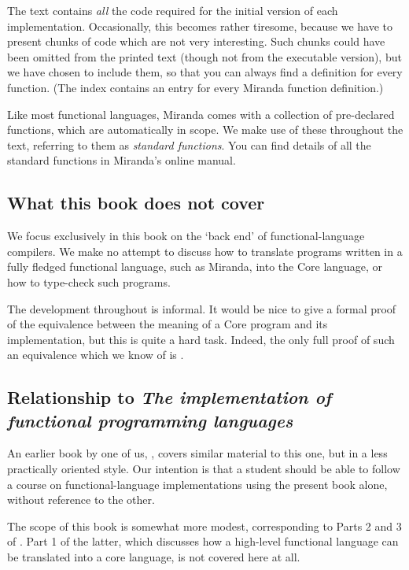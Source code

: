 The text contains {\em all} the code required for the initial version of
each implementation.
Occasionally, this becomes rather tiresome, because we have to present
chunks of code which are not very interesting.  Such chunks could have been
omitted from the printed text (though not from the executable version), but
we have chosen to include them, so that you can always find a definition for
every function. (The index contains an entry for every
Miranda function definition.)

Like most functional languages, Miranda comes with a collection of
pre-declared functions, which are automatically in scope.
We make use of these throughout the text, referring to them as
{\em standard functions}.
You can find details of all the standard functions
in Miranda's online manual.

\subsection*{What this book does not cover}

We focus exclusively in this book on the `back end' of functional-language
compilers.  We make no attempt to discuss how to translate programs written
in a fully fledged functional language, such as Miranda, into the Core language,
or how to type-check such programs.

The development throughout is informal.  It would be nice to give a formal
proof of the equivalence between the meaning of a Core program and
its implementation, but this is quite a hard task.  Indeed, the only
full proof of such an equivalence which we know of is \cite{Lester88}.

\subsection*{Relationship to {\it The implementation of functional
programming languages}}

An earlier book by one of us, \cite{PJBook}, covers similar material to this
one, but in a less practically oriented style.
Our intention is that a student should be able to follow a course
on functional-language implementations using the present book alone, without
reference to the other.

The scope of this book is somewhat more modest, corresponding to
Parts 2 and 3 of \cite{PJBook}.  Part 1 of the latter,
which discusses how a high-level
functional language can be translated into a core language, is not
covered here at all.

